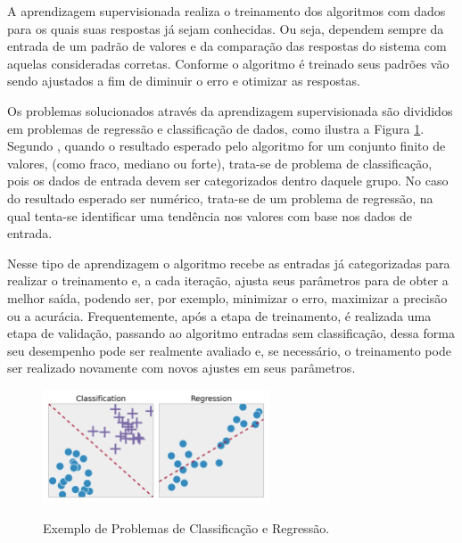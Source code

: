 \documentclass[oneside,openright,12pt]{ufsm_2015} %
\begin{document}
\par A aprendizagem supervisionada realiza o treinamento dos algoritmos com dados para os quais suas respostas já sejam conhecidas. Ou seja, dependem sempre da entrada de um padrão de valores e da comparação das respostas do sistema com aquelas consideradas corretas. Conforme o algoritmo é treinado seus padrões vão sendo ajustados a fim de diminuir o erro e otimizar as respostas. 

\par Os problemas solucionados através da aprendizagem supervisionada são divididos em problemas de regressão e classificação de dados, como ilustra a Figura \ref{fig:aprend-sup}. Segundo \cite{book:russell:10}, quando o resultado esperado pelo algoritmo for um conjunto finito de valores, (como fraco, mediano ou forte), trata-se de problema de classificação, pois os dados de entrada devem ser categorizados dentro daquele grupo. No caso do resultado esperado ser numérico, trata-se de um problema de regressão, na qual tenta-se identificar uma tendência nos valores com base nos dados de entrada.

\par Nesse tipo de aprendizagem o algoritmo recebe as entradas já categorizadas para realizar o treinamento e, a cada iteração, ajusta seus parâmetros para de obter a melhor saída, podendo ser, por exemplo, minimizar o erro, maximizar a precisão ou a acurácia. Frequentemente, após a etapa de treinamento, é realizada uma etapa de validação, passando ao algoritmo entradas sem classificação, dessa forma seu desempenho pode ser realmente avaliado e, se necessário, o treinamento pode ser realizado novamente com novos ajustes em seus parâmetros.

\begin{figure}[ht]
     \caption{Exemplo de Problemas de Classificação e Regressão.}
\centering
\includegraphics[width=0.6\textwidth]{figuras/aprend-sup.png}
\vspace{\baselineskip} %
\label{fig:aprend-sup}
\end{figure}
\end{document}
